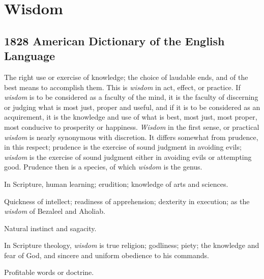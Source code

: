 \section{Wisdom}
	\label{WISDOM}
	

\subsection{1828 American Dictionary of the English Language} %
	\label{WISDOM-1828}

	\begin{compactitem}
		\item[1] The right use or exercise of knowledge; the choice of laudable ends, and of the best means to accomplish them. This is \textit{wisdom} in act, effect, or practice. If \textit{wisdom} is to be considered as a faculty of the mind, it is the faculty of discerning or judging what is most just, proper and useful, and if it is to be considered as an acquirement, it is the knowledge and use of what is best, most just, most proper, most conducive to prosperity or happiness. \textit{Wisdom} in the first sense, or practical \textit{wisdom} is nearly synonymous with discretion. It differs somewhat from prudence, in this respect; prudence is the exercise of sound judgment in avoiding evils; \textit{wisdom} is the exercise of sound judgment either in avoiding evils or attempting good. Prudence then is a species, of which \textit{wisdom} is the genus.
		\item[2] In Scripture, human learning; erudition; knowledge of arts and sciences.
		\item[3] Quickness of intellect; readiness of apprehension; dexterity in execution; as the \textit{wisdom} of Bezaleel and Aholiab. 
		\item[4] Natural instinct and sagacity. 
		\item[5] In Scripture theology, \textit{wisdom} is true religion; godliness; piety; the knowledge and fear of God, and sincere and uniform obedience to his commands.
		\item[6] Profitable words or doctrine.
	\end{compactitem}

